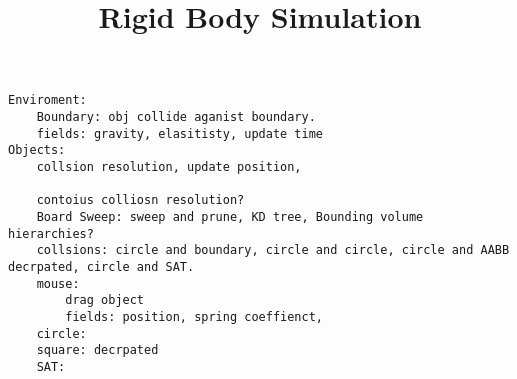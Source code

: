 \documentclass[14pt, fleqn]{extarticle}
\title{Rigid Body Simulation}
\begin{document}
\ttfamily
\setlength{\abovedisplayskip}{-15pt}
\setlength{\belowdisplayskip}{0pt}

\begin{lstlisting}
Enviroment:
	Boundary: obj collide aganist boundary.
	fields: gravity, elasitisty, update time
Objects:
	collsion resolution, update position,

	contoius colliosn resolution?
	Board Sweep: sweep and prune, KD tree, Bounding volume hierarchies?
	collsions: circle and boundary, circle and circle, circle and AABB decrpated, circle and SAT.
	mouse:
		drag object
		fields: position, spring coeffienct,
	circle:
	square: decrpated
	SAT:

\end{lstlisting}
\end{document}
